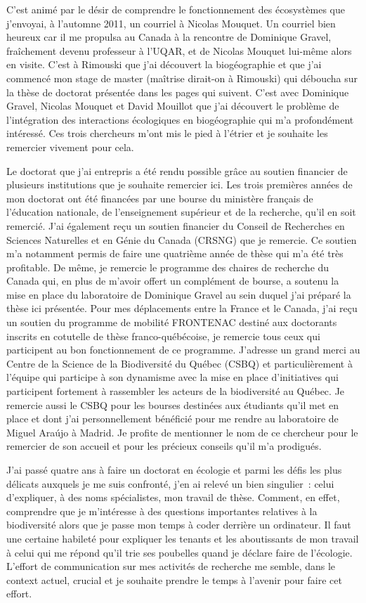 C'est animé par le désir de comprendre le fonctionnement des écosystèmes
que j'envoyai, à l'automne 2011, un courriel à Nicolas Mouquet. Un
courriel bien heureux car il me propulsa au Canada à la rencontre de
Dominique Gravel, fraîchement devenu professeur à l'UQAR, et de Nicolas
Mouquet lui-même alors en visite. C'est à Rimouski que j'ai découvert la
biogéographie et que j'ai commencé mon stage de master (maîtrise
dirait-on à Rimouski) qui déboucha sur la thèse de doctorat présentée
dans les pages qui suivent. C'est avec Dominique Gravel, Nicolas Mouquet
et David Mouillot que j'ai découvert le problème de l'intégration des
interactions écologiques en biogéographie qui m'a profondément
intéressé. Ces trois chercheurs m'ont mis le pied à l'étrier et je
souhaite les remercier vivement pour cela.

Le doctorat que j'ai entrepris a été rendu possible grâce au soutien
financier de plusieurs institutions que je souhaite remercier ici. Les
trois premières années de mon doctorat ont été financées par une bourse
du ministère français de l'éducation nationale, de l'enseignement
supérieur et de la recherche, qu'il en soit remercié. J'ai également
reçu un soutien financier du Conseil de Recherches en Sciences
Naturelles et en Génie du Canada (CRSNG) que je remercie. Ce soutien m'a
notamment permis de faire une quatrième année de thèse qui m'a été très
profitable. De même, je remercie le programme des chaires de recherche
du Canada qui, en plus de m'avoir offert un complément de bourse, a
soutenu la mise en place du laboratoire de Dominique Gravel au sein
duquel j'ai préparé la thèse ici présentée. Pour mes déplacements entre
la France et le Canada, j'ai reçu un soutien du programme de mobilité
FRONTENAC destiné aux doctorants inscrits en cotutelle de thèse
franco-québécoise, je remercie tous ceux qui participent au bon
fonctionnement de ce programme. J'adresse un grand merci au Centre de la
Science de la Biodiversité du Québec (CSBQ) et particulièrement à
l'équipe qui participe à son dynamisme avec la mise en place
d'initiatives qui participent fortement à rassembler les acteurs de la
biodiversité au Québec. Je remercie aussi le CSBQ pour les bourses
destinées aux étudiants qu'il met en place et dont j'ai personnellement
bénéficié pour me rendre au laboratoire de Miguel Araújo à Madrid. Je
profite de mentionner le nom de ce chercheur pour le remercier de son
accueil et pour les précieux conseils qu'il m'a prodigués.

J'ai passé quatre ans à faire un doctorat en écologie et parmi les défis
les plus délicats auxquels je me suis confronté, j'en ai relevé un bien
singulier~: celui d'expliquer, à des noms spécialistes, mon travail de
thèse. Comment, en effet, comprendre que je m'intéresse à des questions
importantes relatives à la biodiversité alors que je passe mon temps à
coder derrière un ordinateur. Il faut une certaine habileté pour
expliquer les tenants et les aboutissants de mon travail à celui qui me
répond qu'il trie ses poubelles quand je déclare faire de l'écologie.
L'effort de communication sur mes activités de recherche me semble, dans
le context actuel, crucial et je souhaite prendre le temps à l'avenir
pour faire cet effort.


